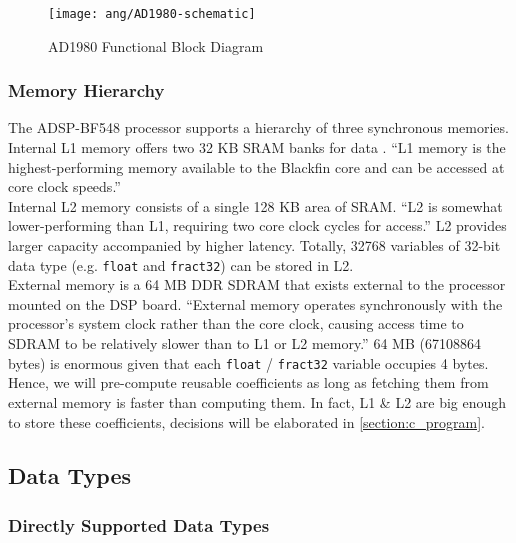 \begin{figure}[H]
\centering
\texttt{[image: ang/AD1980-schematic]}
\caption{AD1980 Functional Block Diagram}
\label{AD1980-schematic}
\end{figure}


\subsubsection{Memory Hierarchy}
The ADSP-BF548 processor supports a hierarchy of three synchronous memories.\\

Internal L1 memory offers two 32 KB SRAM banks for data \cite{bf54x-hardware}. ``L1 memory is the highest-performing memory available to the Blackfin core and can be accessed at core clock speeds.''\cite{start-with-bf548}\\

Internal L2 memory consists of a single 128 KB area of SRAM. ``L2 is somewhat lower-performing than L1, requiring two core clock cycles for access.'' L2 provides larger capacity accompanied by higher latency. \cite{start-with-bf548} Totally, 32768 variables of 32-bit data type (e.g. \texttt{float} and \texttt{fract32}) can be stored in L2.\\

External memory is a 64 MB DDR SDRAM that exists external to the processor mounted on the DSP board. ``External memory operates synchronously with the processor's system clock rather than the core clock, causing access time to SDRAM to be relatively slower than to L1 or L2 memory.''\cite{start-with-bf548} 64 MB (67108864 bytes) is enormous given that each \texttt{float} / \texttt{fract32} variable occupies 4 bytes. Hence, we will pre-compute reusable coefficients as long as fetching them from external memory is faster than computing them. In fact, L1 \& L2 are big enough to store these coefficients, decisions will be elaborated in \autoref{section:c_program}.


\subsection{Data Types}

\subsubsection{Directly Supported Data Types}

